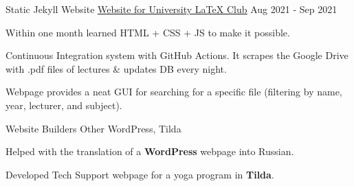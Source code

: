 \begin{cventries}
  \cventry
    {Static Jekyll Website}
    {\href{https://mipt-ltc.github.io/}{\underline{Website for University LaTeX Club}}} 
    {} %
    {Aug 2021 - Sep 2021} %
    {
      \begin{cvitems} %
        \item {Within one month learned HTML + CSS + JS to make it possible.}
        \item {Continuous Integration system with GitHub Actions. It scrapes the Google Drive with .pdf files of lectures \& updates DB every night.}
        \item {Webpage provides a neat GUI for searching for a 
            specific file (filtering by name, year, lecturer, and subject).}
      \end{cvitems}
    }


  \cventry
    {Website Builders}
    {Other} 
    {WordPress, Tilda} %
    {} %
    {
      \begin{cvitems} %
        \item {Helped with the translation of a 
            \textbf{WordPress} webpage into Russian. 
            }
        \item {Developed Tech Support webpage for a yoga program
            in \textbf{Tilda}.}
      \end{cvitems}
    }
 

\end{cventries}

